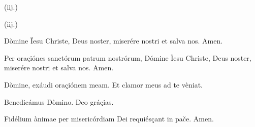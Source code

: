 \prayerText{}\vfill

\prayerText{} \hspace{0.5em} {\fmtPrayerRepeatText (iij.)}\vfill

\prayerVersicleResponseGloriaPatri\vfill

\prayerText{}\vfill

 \hspace{0.5em} {\fmtPrayerRepeatText (iij.)}\vfill

\prayerVersicleResponseGloriaPatri\vfill

\prayerText{}\vfill

\prayerVersicleResponse
{Dòmine Ïesu Christe, Deus noster, miserére nostri et salva nos.}
{Amen.}

\newpage

\prayerText{}

\prayerVersicleResponseGloriaPatri{}

\prayerVersicleResponse
{Per oraçiónes sanctórum patrum nostrórum, Dómine Ïesu Christe, Deus noster, miserére nostri et salva nos.}
{Amen.}

\prayerVersicleResponse
{Dòmine, exáudi oraçiónem meam.}
{Et clamor meus ad te vèniat.}

\prayerVersicleResponse
{Benedicámus Dòmino.}
{Deo gráçias.}

\prayerVersicleResponse
{Fidélium ànimae per misericórdiam Dei requiésçant in pače.}
{Amen.}\vfill

\vfill


